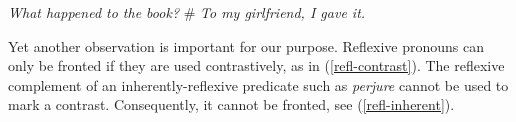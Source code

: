 \documentclass[output=paper]{langsci/langscibook}
\begin{document}
\begin{exe}
\ex \textit{What happened to the book?} \quad
\# \textit{To my girlfriend, I gave it.}\label{en-pars}
\end{exe}

Yet another observation is important for our purpose. Reflexive pronouns can only be fronted if they are used contrastively, as in (\ref{refl-contrast}). The reflexive complement of an inherently-reflexive predicate such as \textit{perjure} cannot be used to mark a contrast. Consequently, it cannot be fronted, see (\ref{refl-inherent}).

\begin{exe}
\ex\label{reflexive}
\begin{xlist}
\end{xlist}
\end{exe}
\end{document}
